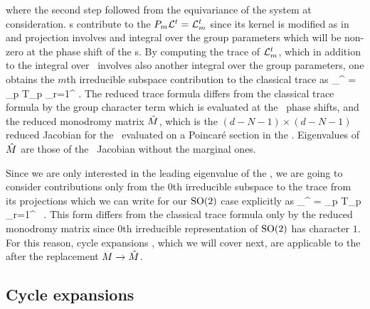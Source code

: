    \label{e-gEvOper}
\eea
where the second step followed from the equivariance of the system at 
consideration. \Rpo s contribute to the $P_m {\cal L}^t = {\cal L}_m^t$ since its 
kernel is modified as in  and projection involves and integral 
over the group parameters which will be non-zero at the phase shift of the 
\rpo s. By computing the trace of ${\cal L}_m^t$, which in addition to the integral
over \statesp\ involves also another integral over the group parameters, one 
obtains the $m$th irreducible subspace contribution to the classical trace as
\beq
\sum_{}^{\infty}  = \sum_p T_p
\sum_{r=1}^{\infty}  .
The reduced trace formula  differs from the 
classical trace formula  by the group character
term which is evaluated at the \rpo\ phase shifts, and the reduced monodromy
matrix $\hat{M}$, which is the $(d-N-1)\times(d-N-1)$ reduced Jacobian 
for the \rpo\ evaluated on a Poincar\'e section in the \reducedsp . Eigenvalues
of $\hat{M}$ are those of the \rpo\ Jacobian  
without the marginal ones. 

Since we are only interested in the leading eigenvalue of the \evOper , we are 
going to consider contributions only from the $0$th irreducible subspace to the 
trace  from its projections 
 which we can write for our $\textrm{SO}(2)$ case 
explicitly as
\beq
\sum_{}^{\infty}  = \sum_p T_p
\sum_{r=1}^{\infty}  \, .
This form differs from the classical trace formula 
 only by the reduced monodromy matrix since 
$0$th irreducible representation of $\textrm{SO}(2)$ has character $1$. For this 
reason, cycle expansions , which we will cover next, are applicable
to the  after the replacement 
$M \rightarrow \hat{M}$. 

\subsection{Cycle expansions}
\label{s-CycExp}


